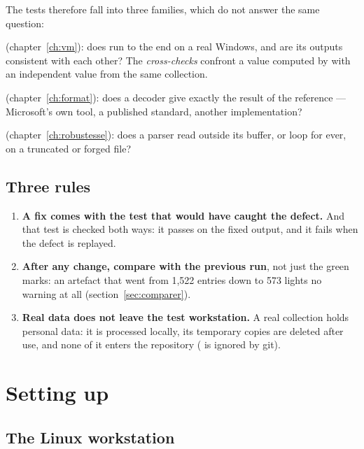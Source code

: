 \documentclass[11pt,a4paper,oneside]{report}
\begin{document}
The tests therefore fall into three families, which do not answer the same
question:

\begin{description}[leftmargin=0pt,itemsep=0.5em]
  \item[The virtual machine cycle] (chapter~\ref{ch:vm}): does \wac{} run to
    the end on a real Windows, and are its outputs consistent with each other?
    The \emph{cross-checks} confront a value computed by \wac{} with an
    independent value from the same collection.
  \item[The format harnesses] (chapter~\ref{ch:format}): does a decoder give
    exactly the result of the reference — Microsoft's own tool, a published
    standard, another implementation?
  \item[The robustness harnesses] (chapter~\ref{ch:robustesse}): does a parser
    read outside its buffer, or loop for ever, on a truncated or forged file?
\end{description}

\section{Three rules}

\begin{enumerate}
  \item \textbf{A fix comes with the test that would have caught the defect.}
    And that test is checked both ways: it passes on the fixed output, and it
    fails when the defect is replayed.
  \item \textbf{After any change, compare with the previous run}, not just the
    green marks: an artefact that went from 1,522 entries down to 573 lights no
    warning at all (section~\ref{sec:comparer}).
  \item \textbf{Real data does not leave the test workstation.} A real
    collection holds personal data: it is processed locally, its temporary
    copies are deleted after use, and none of it enters the repository
    ( is ignored by git).
\end{enumerate}

\chapter{Setting up}

\section{The Linux workstation}
\end{document}
